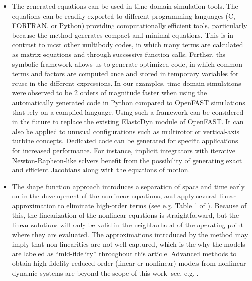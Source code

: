 \documentclass[wes, manuscript]{copernicus}
\begin{document}
\begin{itemize}
\item The generated equations can be used in time domain simulation tools.
The equations can be readily exported to different programming languages (C, FORTRAN, or Python)  providing computationally efficient tools, particularly because the method generates compact and minimal equations.
This is in contrast to most other multibody codes, in which many terms are calculated as matrix equations and through successive function calls.
Further, the symbolic framework allows us to generate optimized code, in which common terms and factors are computed once and stored in temporary variables for reuse in the different expressions.
%
In our examples, time domain simulations were observed to be 2 orders of magnitude faster when using the automatically generated code in Python compared to OpenFAST simulations that rely on a compiled language. 
%
Using such a framework can be considered in the future to replace the existing ElastoDyn module of OpenFAST.
It can also be applied to unusual configurations such as multirotor or vertical-axis turbine concepts. 
%
Dedicated code can be generated for specific applications for increased performance.
For instance, implicit integrators with iterative Newton-Raphson-like solvers benefit from the possibility of generating exact and efficient Jacobians along with the equations of motion.


\item The shape function approach introduces a separation of space and time early on in the development of the nonlinear equations, and apply several linear approximation to eliminate high-order terms (see e.g. Table 1 of \cite{Wallrapp:1994}). Because of this, the linearization of the nonlinear equations is straightforward, but the linear solutions will only be valid in the neighborhood of the operating point where they are evaluated. 
The approximations introduced by the method may imply that non-linearities are not well captured, which is the why the models are labeled as ``mid-fidelity'' throughout this article. 
Advanced methods to obtain high-fidelity reduced-order (linear or nonlinear) models from nonlinear dynamic systems are beyond the scope of this work, see, e.g.
\cite{Steindl:2001, Mignolet:2013, Benner:2015}.



\end{itemize}
\end{document}
